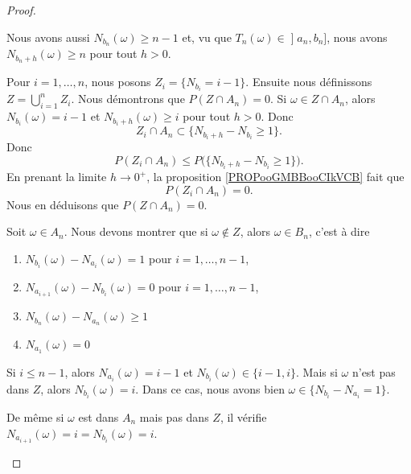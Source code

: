 \begin{proof}
\begin{subproof}
\begin{subproof}
			Nous avons aussi \( N_{b_n}(\omega)\geq n-1\) et, vu que \( T_n(\omega)\in \mathopen] a_n , b_n \mathclose]\), nous avons \( N_{b_n+h}(\omega)\geq n\) pour tout \( h>0\).
		\end{subproof}
		Pour \( i=1,\ldots, n\), nous posons \( Z_i=\{ N_{b_i}=i-1 \}\). Ensuite nous définissons \( Z=\bigcup_{i=1}^nZ_i\). Nous démontrons que \( P(Z\cap A_n)=0\). Si \( \omega\in Z\cap A_n\), alors \( N_{b_i}(\omega)=i-1\) et \( N_{b_i+h}(\omega)\geq i\) pour tout \( h>0\). Donc
		\begin{equation}
			Z_i\cap A_n\subset\{ N_{b_i+h}-N_{b_i}\geq 1 \}.
		\end{equation}
		Donc
		\begin{equation}
			P(Z_i\cap A_n)\leq P\big( \{ N_{b_i+h}-N_{b_i}\geq 1 \} \big).
		\end{equation}
		En prenant la limite \( h\to 0^+\), la proposition \ref{PROPooGMBBooCIkVCB} fait que
		\begin{equation}
			P(Z_i\cap A_n)=0.
		\end{equation}
		Nous en déduisons que \( P(Z\cap A_n)=0\).

		Soit \( \omega\in A_n\). Nous devons montrer que si \( \omega\notin Z\), alors \( \omega\in B_n\), c'est à dire
		\begin{enumerate}
			\item
			      $ N_{b_i}(\omega)-N_{a_i}(\omega)=1 $ pour \( i=1,\ldots, n-1\),
			\item
			      $N_{a_{i+1}}(\omega)-N_{b_i}(\omega)=0$ pour \( i=1,\ldots, n-1\),
			\item

			      $N_{b_n}(\omega)-N_{a_n}(\omega)\geq 1$
			\item
			      $N_{a_1}(\omega)=0$
		\end{enumerate}

		Si \( i\leq n-1\), alors \( N_{a_i}(\omega)=i-1\) et \( N_{b_i}(\omega)\in \{ i-1,i \}\). Mais si \( \omega\) n'est pas dans \( Z\), alors \( N_{b_i}(\omega)=i\). Dans ce cas, nous avons bien \( \omega\in\{ N_{b_i}-N_{a_i}=1 \}\).

		De même si \( \omega\) est dans \( A_n\) mais pas dans \( Z\), il vérifie \( N_{a_{i+1}}(\omega)=i= N_{b_i}(\omega)=i\).


\end{subproof}
\end{proof}
